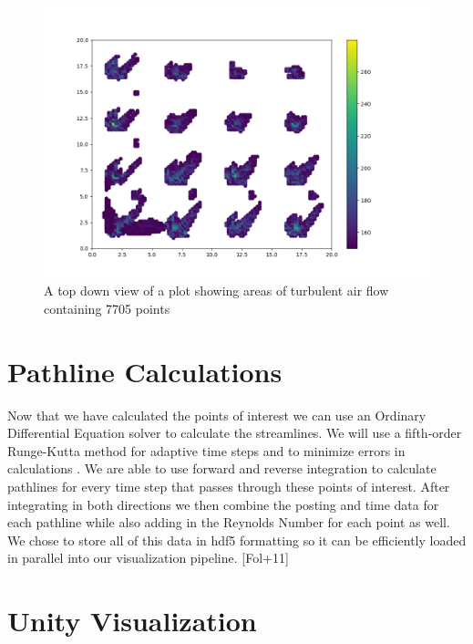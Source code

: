 \begin{figure}
\centering
\includegraphics[scale=.35]{Figures/Turb2D_4_11.png}
\decoRule
\caption[Turbulent Air Flow Scatter Plot]{A top down view of a plot showing areas of turbulent air flow containing 7705 points}
\label{fig:MTurbulentflow}
\end{figure}
\section{Pathline Calculations}

Now that we have calculated the points of interest we can use an Ordinary Differential Equation solver to calculate the streamlines. We will use a fifth-order Runge-Kutta method for adaptive time steps and to minimize errors in calculations \cite{Teitzel1997}. We are able to use forward and reverse integration to calculate pathlines for every time step that passes through these points of interest. After integrating in both directions we then combine the posting and time data for each pathline while also adding in the Reynolds Number for each point as well. We chose to store all of this data in hdf5 formatting so it can be efficiently loaded in parallel into our visualization pipeline\cite{hdf5}. [Fol+11] 



\section{Unity Visualization}

